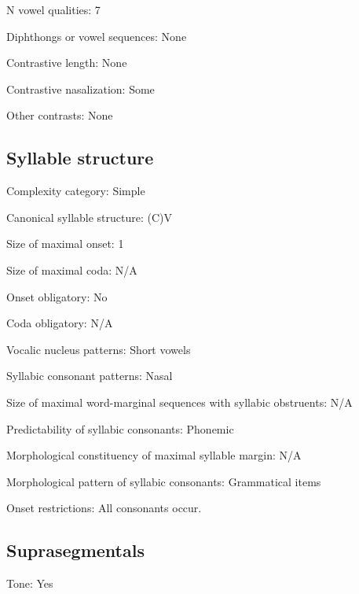 {\begin{appendixdesc}
\item[N vowel qualities:] 7

\item[Diphthongs or vowel sequences:] None

\item[Contrastive length:] None

\item[Contrastive nasalization:] Some

\item[Other contrasts:] None
\end{appendixdesc}
\subsection*{Syllable structure}
\begin{appendixdesc}

\item[Complexity category:] Simple

\item[Canonical syllable structure:] (C)V \citep[6]{Bamgbose1966}

\item[Size of maximal onset:] 1

\item[Size of maximal coda:] N/A

\item[Onset obligatory:] No

\item[Coda obligatory:] N/A

\item[Vocalic nucleus patterns:] Short vowels

\item[Syllabic consonant patterns:] Nasal

\item[Size of maximal word-marginal sequences with syllabic obstruents:] N/A

\item[Predictability of syllabic consonants:] Phonemic

\item[Morphological constituency of maximal syllable margin:] N/A

\item[Morphological pattern of syllabic consonants:] Grammatical items

\item[Onset restrictions:] All consonants occur.
\end{appendixdesc}
\subsection*{Suprasegmentals}
\begin{appendixdesc}
\item[Tone:] Yes


\end{appendixdesc}}
